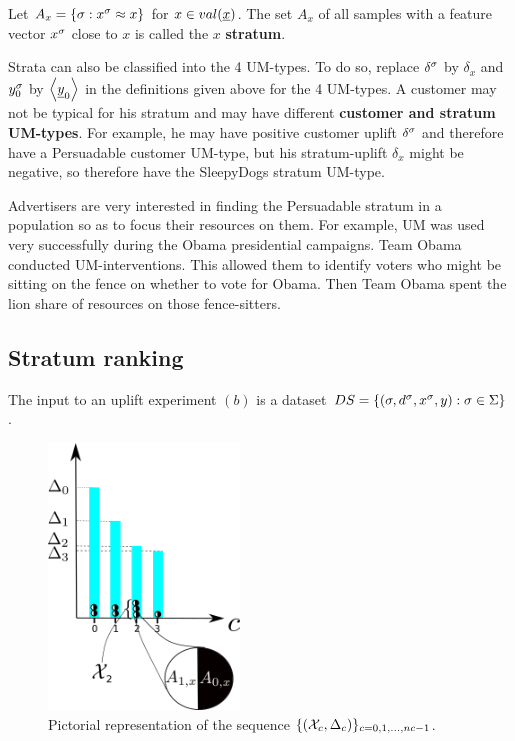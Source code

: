 Let $A_x = \{\sigma: x^\sigma \approx x\}$ for  $x\in val(\rvx)$.
The set $A_x$ of all samples with
a feature vector $x^\sigma$ close to $x$ 
is called the $x$ {\bf stratum}.

Strata can also be
classified into
the 4 UM-types. To do
so, replace $\delta^\sigma$ by $\delta_x$
and $y^\sigma_0$ by $\av{\rvy_0}$
in the definitions given above for the 4 UM-types.
A customer 
may not be typical for
his stratum
and may
have different
{\bf customer and stratum UM-types}.
For example, he may have positive 
customer uplift $\delta^\sigma$
and therefore have a Persuadable customer UM-type,
but his stratum-uplift  $\delta_x$
might be negative, so
therefore have
the SleepyDogs stratum UM-type.

Advertisers are very interested in finding
the Persuadable stratum in a population
so as to focus their resources on them.
For example, UM was used very
successfully during the 
Obama presidential campaigns. 
Team Obama conducted UM-interventions.
This allowed them to
identify voters who might be sitting on the fence
on whether to vote for Obama.
Then Team Obama spent
the lion share
of  resources  on those
fence-sitters.



\subsection{Stratum ranking}
\label{sec-up-ranking}

The input
to an uplift experiment $(b)$ is a
dataset $DS= \{ (\sigma, d^\sigma, x^\sigma,  y):
 \sigma\in\Sigma\}$.
 
\begin{figure}[h!]
\centering
\includegraphics[width=2in]
{uplift/uplift-bins-up.png}
\caption{
Pictorial
representation
of the sequence
$\{({\cal X}_c, \Delta_c)\}_{c=0, 1, \ldots, nc-1}$.
}
\label{fig-uplift-bins}
\end{figure}


